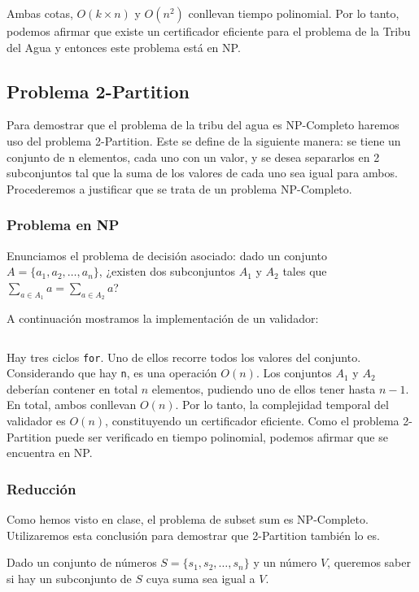 \documentclass{article}
\begin{document}
Ambas cotas, $O(k \times n)$ y $O(n^2)$ conllevan tiempo polinomial. Por lo tanto, podemos afirmar que existe un certificador eficiente para el problema de la Tribu del Agua y entonces este problema está en NP.

\subsection{Problema 2-Partition}
\label{subsec:partition}

Para demostrar que el problema de la tribu del agua es NP-Completo haremos uso del problema 2-Partition. Este se define de la siguiente manera: se tiene un conjunto de n elementos, cada uno con un valor, y se desea separarlos en 2 subconjuntos tal que la suma de los valores de cada uno sea igual para ambos. Procederemos a justificar que se trata de un problema NP-Completo.

\subsubsection{Problema en NP}
Enunciamos el problema de decisión asociado: dado un conjunto \( A =\{a_1, a_2, \ldots, a_n\} \), ¿existen dos subconjuntos \( A_1 \) y \( A_2 \) tales que \( \sum_{a \in A_1} a = \sum_{a \in A_2} a \)?

A continuación mostramos la implementación de un validador:
\inputminted[linenos]{python}{codigo/certificador_2_partition.py}

Hay tres ciclos \texttt{for}. Uno de ellos recorre todos los valores del conjunto. Considerando que hay \texttt{n}, es una operación $O(n)$. Los conjuntos $A_1$ y $A_2$ deberían contener en total $n$ elementos, pudiendo uno de ellos tener hasta  $n-1$. En total, ambos conllevan $O(n)$. Por lo tanto, la complejidad temporal del validador es $O(n)$, constituyendo un certificador eficiente. Como el problema 2-Partition puede ser verificado en tiempo polinomial, podemos afirmar que se encuentra en NP.

\subsubsection{Reducción}
\label{sec:np-completo-2p}

Como hemos visto en clase, el problema de subset sum es NP-Completo. Utilizaremos esta conclusión para demostrar que 2-Partition también lo es.

Dado un conjunto de números \( S = \{s_1, s_2, \ldots, s_n\} \) y un número \( V \), queremos saber si hay un subconjunto de \( S \) cuya suma sea igual a \( V \).
\end{document}
